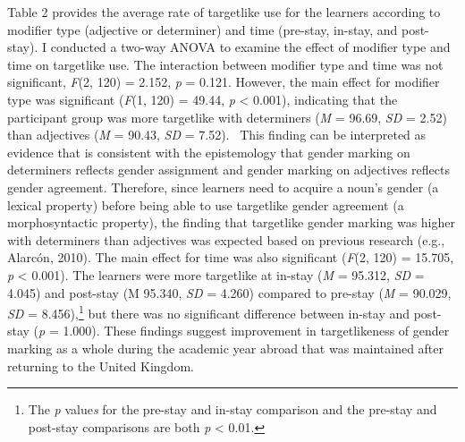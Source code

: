 \documentclass[12pt]{article}
\newenvironment{styleNoSpacing}{\setlength\leftskip{0cm}\setlength\rightskip{0cm plus 1fil}\setlength\parindent{0cm}\setlength\parfillskip{0pt plus 1fil}\setlength\parskip{0cm plus 1pt}\writerlistparindent\writerlistleftskip\leavevmode\normalfont\normalsize\fontsize{11pt}{13.2pt}\selectfont\writerlistlabel\ignorespaces}{\unskip\vspace{0cm plus 1pt}\par}
\newcommand\writerlistleftskip{}
\newcommand\writerlistparindent{}
\newcommand\writerlistlabel{}
\begin{document}
\begin{styleNoSpacing}
Table 2 provides the average rate of targetlike use for the learners according to modifier type (adjective or determiner) and time (pre-stay, in-stay, and post-stay). I conducted a two-way ANOVA to examine the effect of modifier type and time on targetlike use. The interaction between modifier type and time was not significant, \textit{F}(2, 120) = 2.152, \textit{p} = 0.121. However, the main effect for modifier type was significant (\textit{F}(1, 120) = 49.44, \textit{p} {\textless} 0.001), indicating that the participant group was more targetlike with determiners (\textit{M} = 96.69, \textit{SD} = 2.52) than adjectives (\textit{M }= 90.43, \textit{SD} = 7.52). \ This finding can be interpreted as evidence that is consistent with the epistemology that gender marking on determiners reflects gender assignment and gender marking on adjectives reflects gender agreement. Therefore, since learners need to acquire a noun’s gender (a lexical property) before being able to use targetlike gender agreement (a morphosyntactic property), the finding that targetlike gender marking was higher with determiners than adjectives was expected based on previous research (e.g., Alarcón, 2010). The main effect for time was also significant (\textit{F}(2, 120) = 15.705, \textit{p} {\textless} 0.001). The learners were more targetlike at in-stay (\textit{M }= 95.312, \textit{SD} = 4.045) and post-stay (M 95.340, \textit{SD} = 4.260) compared to pre-stay (\textit{M }= 90.029, \textit{SD} = 8.456),\footnote{\textrm{ The }\textrm{\textit{p }}\textrm{value}\textrm{\textit{s }}\textrm{for the pre-stay and in-stay comparison and the pre-stay and post-stay comparisons are both }\textrm{\textit{p}}\textrm{ {\textless} 0.01.}} but there was no significant difference between in-stay and post-stay (\textit{p} = 1.000). These findings suggest improvement in targetlikeness of gender marking as a whole during the academic year abroad that was maintained after returning to the United Kingdom. 
\end{styleNoSpacing}
\end{document}
